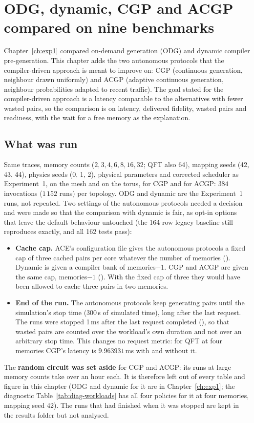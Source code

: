 \chapter{ODG, dynamic, CGP and ACGP compared on nine benchmarks}
\label{ch:four-policies}

Chapter~\ref{ch:exp1} compared on-demand generation (ODG) and dynamic compiler pre-generation. This chapter adds the two autonomous protocols that the compiler-driven approach is meant to
improve on: CGP (continuous generation, neighbour drawn uniformly) and ACGP (adaptive continuous generation, neighbour probabilities adapted to recent traffic). The goal
stated for the compiler-driven approach is a latency comparable to the alternatives with fewer wasted pairs, so the comparison is on latency, delivered fidelity, wasted pairs and readiness, with the
wait for a free memory as the explanation.

\section{What was run}
Same traces, memory counts ($2,3,4,6,8,16,32$; QFT also $64$), mapping seeds (42, 43, 44), physics seeds (0, 1, 2), physical parameters and corrected scheduler as Experiment~1, on the mesh and on the
torus, for CGP and for ACGP: $384$ invocations ($1\,152$ runs) per topology. ODG and dynamic are the Experiment~1 runs, not repeated. Two settings of the autonomous protocols needed a decision and were made so that the
comparison with dynamic is fair, as opt-in options that leave the default behaviour untouched (the 164-row legacy baseline still reproduces exactly, and all 162 tests pass):
\begin{itemize}
  \item \textbf{Cache cap.} ACE's configuration file gives the autonomous protocols a fixed cap of three cached pairs per core whatever the number of memories (). Dynamic is given a compiler bank of memories$-1$.
    CGP and ACGP are given the same cap, memories$-1$ (). With the fixed cap of three they would have been allowed to cache three pairs in two memories.
  \item \textbf{End of the run.} The autonomous protocols keep generating pairs until the simulation's stop time (300\,s of simulated time), long after the last request. The runs were stopped 1\,ms after the last request completed
    (), so that wasted pairs are counted over the workload's own duration and not over an arbitrary stop time. This changes no request metric: for QFT at four memories CGP's latency is
    $9.963931$\,ms with and without it.
\end{itemize}
The \textbf{random circuit was set aside} for CGP and ACGP: its runs at large memory counts take over an hour each. It is therefore left out of every table and figure in this chapter (ODG and dynamic for it are in Chapter~\ref{ch:exp1};
the diagnostic Table~\ref{tab:diag-workloads} has all four policies for it at four memories, mapping seed 42). The runs that had finished when it was stopped are kept in the results folder but not analysed.

